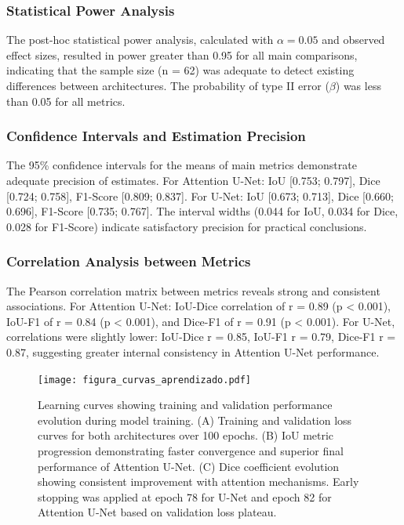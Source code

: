 \documentclass[12pt,a4paper,twoside]{article}
\begin{document}
\subsubsection{Statistical Power Analysis}

The post-hoc statistical power analysis, calculated with $\alpha = 0.05$ and observed effect sizes, resulted in power greater than 0.95 for all main comparisons, indicating that the sample size (n = 62) was adequate to detect existing differences between architectures. The probability of type II error ($\beta$) was less than 0.05 for all metrics.

\subsubsection{Confidence Intervals and Estimation Precision}

The 95\% confidence intervals for the means of main metrics demonstrate adequate precision of estimates. For Attention U-Net: IoU [0.753; 0.797], Dice [0.724; 0.758], F1-Score [0.809; 0.837]. For U-Net: IoU [0.673; 0.713], Dice [0.660; 0.696], F1-Score [0.735; 0.767]. The interval widths (0.044 for IoU, 0.034 for Dice, 0.028 for F1-Score) indicate satisfactory precision for practical conclusions.

\subsubsection{Correlation Analysis between Metrics}

The Pearson correlation matrix between metrics reveals strong and consistent associations. For Attention U-Net: IoU-Dice correlation of r = 0.89 (p < 0.001), IoU-F1 of r = 0.84 (p < 0.001), and Dice-F1 of r = 0.91 (p < 0.001). For U-Net, correlations were slightly lower: IoU-Dice r = 0.85, IoU-F1 r = 0.79, Dice-F1 r = 0.87, suggesting greater internal consistency in Attention U-Net performance.

\begin{figure}[H]
    \centering
    \texttt{[image: figura\_curvas\_aprendizado.pdf]}
    \caption{Learning curves showing training and validation performance evolution during model training. (A) Training and validation loss curves for both architectures over 100 epochs. (B) IoU metric progression demonstrating faster convergence and superior final performance of Attention U-Net. (C) Dice coefficient evolution showing consistent improvement with attention mechanisms. Early stopping was applied at epoch 78 for U-Net and epoch 82 for Attention U-Net based on validation loss plateau.}
    \label{fig:learning_curves}
\end{figure}
\end{document}
